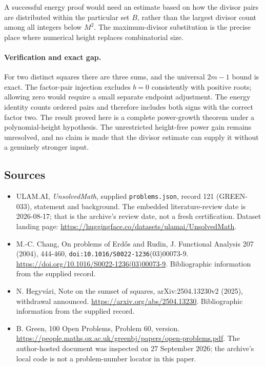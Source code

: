 \documentclass[11pt,a4paper]{article}
\begin{document}
A successful energy proof would need an estimate based on how the divisor pairs are distributed within the particular set $B$, rather than the largest divisor count among all integers below $M^2$. The maximum-divisor substitution is the precise place where numerical height replaces combinatorial size.

\paragraph{Verification and exact gap.}
For two distinct squares there are three sums, and the universal $2m-1$ bound is exact. The factor-pair injection excludes $b=0$ consistently with positive roots; allowing zero would require a small separate endpoint adjustment. The energy identity counts ordered pairs and therefore includes both signs with the correct factor two. The result proved here is a complete power-growth theorem under a polynomial-height hypothesis. The unrestricted height-free power gain remains unresolved, and no claim is made that the divisor estimate can supply it without a genuinely stronger input.

\subsection{Sources}

{\small

\begin{itemize}

\item[\hypertarget{source:121:1}{S1}] ULAM.AI, \emph{UnsolvedMath}, supplied \texttt{problems.json}, record 121 (GREEN-033), statement and background. The embedded literature-review date is 2026-08-17; that is the archive’s review date, not a fresh certification. Dataset landing page: \url{https://huggingface.co/datasets/ulamai/UnsolvedMath}.

\item[\hypertarget{source:121:2}{S2}] M.-C. Chang, On problems of Erdős and Rudin, J. Functional Analysis 207 (2004), 444-460, \nolinkurl{doi:10.1016/S0022-1236}(03)00073-9. \url{https://doi.org/10.1016/S0022-1236(03)00073-9}. Bibliographic information from the supplied record.

\item[\hypertarget{source:121:3}{S3}] N. Hegyvári, Note on the sumset of squares, arXiv:2504.13230v2 (2025), withdrawal announced. \url{https://arxiv.org/abs/2504.13230}. Bibliographic information from the supplied record.

\item[\hypertarget{source:121:4}{S4}] B. Green, 100 Open Problems, Problem 60, version. \url{https://people.maths.ox.ac.uk/greenbj/papers/open-problems.pdf}. The author-hosted document was inspected on 27 September 2026; the archive’s local code is not a problem-number locator in this paper.

\end{itemize}

}

\label{end:121}
\end{document}
